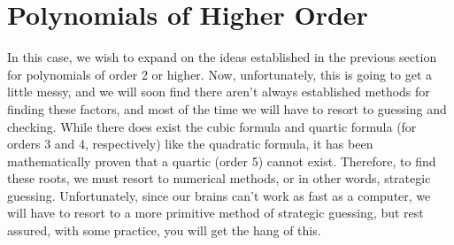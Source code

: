 \documentclass[11pt]{article}
\numberwithin{lemma}{section}
\numberwithin{equation}{section}
\numberwithin{define}{section}
\numberwithin{prop}{section}
\numberwithin{figure}{section}
\numberwithin{theorem}{section}
\newcounter{ex}[section]
\numberwithin{ex}{section}
\begin{document}
\section{Polynomials of Higher Order}
In this case, we wish to expand on the ideas established in the previous section for polynomials of order 2 or higher. 
Now, unfortunately, this is going to get a little messy, and we will soon find there aren't always established methods for finding these factors, and most of the time we will have to resort to guessing and checking. 
While there does exist the cubic formula and quartic formula (for orders 3 and 4, respectively) like the quadratic formula, it has been mathematically proven that a quartic (order 5) cannot exist.
Therefore, to find these roots, we must resort to numerical methods, or in other words, strategic guessing.
Unfortunately, since our brains can't work as fast as a computer, we will have to resort to a more primitive method of strategic guessing, but rest assured, with some practice, you will get the hang of this.
\end{document}
